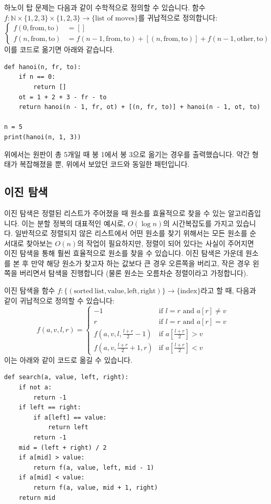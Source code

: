 \documentclass[../main.tex]{subfiles}
\begin{document}
하노이 탑 문제는 다음과 같이 수학적으로 정의할 수 있습니다.
함수 $f: \mathbb{N} \times \{1, 2, 3\} \times \{1, 2, 3\} \rightarrow \{\text{list of moves}\}$를 귀납적으로 정의합니다:
\[
\begin{cases}f(0, \mathrm{from}, \mathrm{to}) &= []\\
f(n, \mathrm{from}, \mathrm{to}) &= f(n - 1, \mathrm{from}, \mathrm{to}) + [(n, \mathrm{from}, \mathrm{to})] + f(n - 1, \mathrm{other}, \mathrm{to})\end{cases}
\]
이를 코드로 옮기면 아래와 같습니다.
\begin{verbatim}
def hanoi(n, fr, to):
    if n == 0:
        return []
    ot = 1 + 2 + 3 - fr - to
    return hanoi(n - 1, fr, ot) + [(n, fr, to)] + hanoi(n - 1, ot, to)

n = 5
print(hanoi(n, 1, 3))
\end{verbatim}
위에서는 원판이 총 5개일 때 봉 1에서 봉 3으로 옮기는 경우를 출력했습니다.
약간 형태가 복잡해졌을 뿐, 위에서 보았던 코드와 동일한 패턴입니다.

\subsection{이진 탐색}
이진 탐색은 정렬된 리스트가 주어졌을 때 원소를 효율적으로 찾을 수 있는 알고리즘입니다.
이는 분할 정복의 대표적인 예시로, $O(\log n)$의 시간복잡도를 가지고 있습니다.
일반적으로 정렬되지 않은 리스트에서 어떤 원소를 찾기 위해서는 모든 원소를 순서대로 찾아보는 $O(n)$의 작업이 필요하지만, 정렬이 되어 있다는 사실이 주어지면 이진 탐색을 통해 훨씬 효율적으로 원소를 찾을 수 있습니다.
이진 탐색은 가운데 원소를 본 후 만약 해당 원소가 찾고자 하는 값보다 큰 경우 오른쪽을 버리고, 작은 경우 왼쪽을 버리면서 탐색을 진행합니다 (물론 원소는 오름차순 정렬이라고 가정합니다).

이진 탐색을 함수 $f: \{(\mathrm{sorted\ list}, \mathrm{value}, \mathrm{left}, \mathrm{right})\} \rightarrow \{\mathrm{index}\}$라고 할 때, 다음과 같이 귀납적으로 정의할 수 있습니다:
\[
f(a, v, l, r) = \begin{cases}
-1 & \text{if } l = r \text{ and } a[r] \neq v\\
r & \text{if } l = r \text{ and } a[r] = v\\
f\left(a, v, l, \frac{l + r}{2} - 1\right) & \text{if } a\left[\frac{l + r}{2}\right] > v\\
f\left(a, v, \frac{l + r}{2} + 1, r\right) & \text{if } a\left[\frac{l + r}{2}\right] < v
\end{cases}
\]
이는 아래와 같이 코드로 옮길 수 있습니다.
\begin{verbatim}
def search(a, value, left, right):
    if not a:
        return -1
    if left == right:
        if a[left] == value:
            return left
        return -1
    mid = (left + right) / 2
    if a[mid] > value:
        return f(a, value, left, mid - 1)
    if a[mid] < value:
        return f(a, value, mid + 1, right)
    return mid
\end{verbatim}
\end{document}
